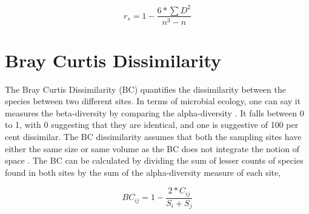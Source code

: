 $$r_{s} = 1 - \frac{6 * \sum D^{2}}{n^{3} - n}$$

\section{Bray Curtis Dissimilarity}
The Bray Curtis Dissimilarity (BC) quantifies the dissimilarity between the species between two different sites. In terms of microbial ecology, one can say it measures the beta-diversity by comparing the alpha-diversity \cite{zhang_2019_the}. It falls between 0 to 1, with 0 suggesting that they are identical, and one is suggestive of 100 per cent dissimilar. The BC dissimilarity assumes that both the sampling sites have either the same size or same volume as the BC does not integrate the notion of space \cite{zhang_2019_the}. The BC can be calculated by dividing the sum of lesser counts of species found in both sites by the sum of the alpha-diversity measure of each site,

$$BC_{ij} = 1 - \frac{2 * C_{ij}}{S_{i} + S_{j}}$$